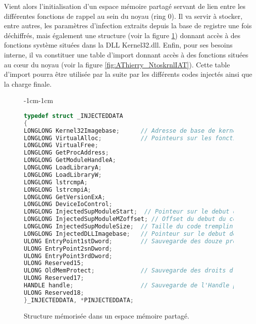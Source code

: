 Vient alors l'initialisation d'un espace mémoire partagé servant de lien entre les différentes fonctions de rappel au sein du noyau (ring 0). Il va servir à stocker, entre autres, les paramètres d'infection extraits depuis la base de registre une fois déchiffrés, mais également une structure (voir la figure \ref{fig:AThierry_InjectedDataStruct}) donnant accès à des fonctions système situées dans la DLL Kernel32.dll. Enfin, pour ses besoins interne, il va constituer une table d'import donnant accès à des fonctions situées au c\oe ur du noyau (voir la figure \ref{fig:AThierry_NtoskrnlIAT}). Cette table d'import pourra être utilisée par la suite par les différents codes injectés ainsi que la charge finale.
\begin{figure}
\scriptsize
\begin{changemargin}{-1cm}{-1cm}
\begin{lstlisting}[language={C}]
typedef struct _INJECTEDDATA  
{ 
LONGLONG Kernel32Imagebase;      // Adresse de base de kernel32.dll
LONGLONG VirtualAlloc;           // Pointeurs sur les fonctions de Kernel32 utilisees par le code injecte
LONGLONG VirtualFree;           
LONGLONG GetProcAddress;   
LONGLONG GetModuleHandleA; 
LONGLONG LoadLibraryA;      
LONGLONG LoadLibraryW;     
LONGLONG lstrcmpA;         
LONGLONG lstrcmpiA;        
LONGLONG GetVersionExA;    
LONGLONG DeviceIoControl;  
LONGLONG InjectedSupModuleStart;  // Pointeur sur le debut de la memoire allouee dans le processus cible
LONGLONG InjectedSupModuleMZoffset; // Offset du debut du code tremplin injecte
LONGLONG InjectedSupModuleSize;  // Taille du code tremplin injecte
LONGLONG InjectedDLLImagebase;   // Pointeur sur le debut de la DLL injectee             
ULONG EntryPoint1stDword;        // Sauvegarde des douze premiers octets du point d'entree de la cible
ULONG EntryPoint2snDword;  
ULONG EntryPoint3rdDword;  
ULONG Reserved15;                   
ULONG OldMemProtect;             // Sauvegarde des droits d'acces originaux
ULONG Reserved17;                   
HANDLE handle;                   // Sauvegarde de l'Handle permettant de communiquer avec le driver depuis l'espace utilisateur
ULONG Reserved18;                
}_INJECTEDDATA, *PINJECTEDDATA;
\end{lstlisting}
\end{changemargin}
\caption{Structure mémorisée dans un espace mémoire partagé.\label{fig:AThierry_InjectedDataStruct}}
\end{figure}
  
